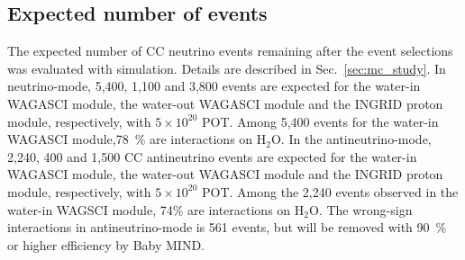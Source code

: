 \subsection{Expected number of events}
The expected number of
CC neutrino events remaining after the event selections was evaluated with simulation.
Details are described
in Sec.~\ref{sec:mc_study}.
In neutrino-mode, 5,400, 1,100 and 3,800 events are expected for the water-in WAGASCI module, the water-out WAGASCI module 
and the INGRID proton module, respectively, with $5\times10^{20}$ POT.
Among 5,400 events for the water-in WAGASCI module,78~\%  are interactions on $\mathrm{H_2O}$.
In the antineutrino-mode, 2,240, 400 and 1,500 CC antineutrino events are expected for the water-in WAGASCI module, the water-out WAGASCI module 
and the INGRID proton module, respectively, with
$5\times 10^{20}$ POT. 
Among the 2,240 events observed in the water-in WAGSCI module, 74\% are
interactions on $\mathrm{H_2O}$.
The wrong-sign interactions in antineutrino-mode is 561 events, but will be removed with 90~\% or higher efficiency by Baby MIND.




